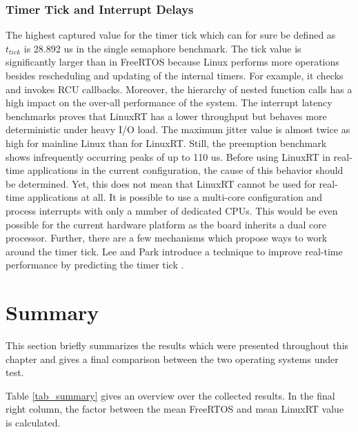 \subsubsection{Timer Tick and Interrupt Delays}
The highest captured value for the timer tick which can for sure be defined as $t_{tick}$ is 28.892 us in the single semaphore benchmark.
The tick value is significantly larger than in FreeRTOS because Linux performs more operations besides rescheduling and updating of the internal timers. 
For example, it checks and invokes \ac{RCU} callbacks.
Moreover, the hierarchy of nested function calls has a high impact on the over-all performance of the system. 
The interrupt latency benchmarks proves that LinuxRT has a lower throughput but behaves more deterministic under heavy \ac{I/O} load. 
The maximum jitter value is almost twice as high for mainline Linux than for LinuxRT.
Still, the preemption benchmark shows infrequently occurring peaks of up to 110 us. 
Before using LinuxRT in real-time applications in the current configuration, the cause of this behavior should be determined.
Yet, this does not mean that LinuxRT cannot be used for real-time applications at all.
It is possible to use a multi-core configuration and process interrupts with only a number of dedicated \acp{CPU}.
This would be even possible for the current hardware platform as the board inherits a dual core processor.
Further, there are a few mechanisms which propose ways to work around the timer tick.
Lee and Park introduce a technique to improve real-time performance by predicting the timer tick \cite{lee:dltfirtpoelbpoti}.

\section{Summary}\label{s_summary}
This section briefly summarizes the results which were presented throughout this chapter and gives a final comparison between the two operating systems under test.
\par
Table \ref{tab_summary} gives an overview over the collected results.
In the final right column, the factor between the mean FreeRTOS and mean LinuxRT value is calculated. 

